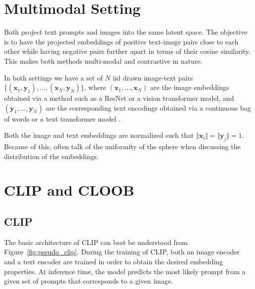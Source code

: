 \documentclass{scrarticle}
\begin{document}
\section{Multimodal Setting}

Both \citet{cloob,clip} project text prompts and images into the same latent space. The objective is to have the projected embeddings of positive text-image pairs close to each other while having negative pairs further apart in terms of their cosine similarity. This makes both methods multi-modal and contrastive in nature.

In both settings we have a set of $N$ iid drawn image-text pairs $\{(\mathbf{x}_1, \mathbf{y}_1), \dots, (\mathbf{x}_N, \mathbf{y}_N)\}$, where $(\mathbf{x}_1, \dots, \mathbf{x}_N)$ are the image embeddings obtained via a method such as a ResNet or a vision transformer model, and $(\mathbf{y}_1, \dots, \mathbf{y}_N)$ are the corresponding text encodings obtained via a continuous bag of words or a text transformer model \cite{cloob,clip}.

Both the image and text embeddings are normalized such that $\Vert \mathbf{x}_i \Vert = \Vert \mathbf{y}_j \Vert = 1$. Because of this, \citet{cloob} often talk of the uniformity of the sphere when discussing the distribution of the embeddings.

\section{CLIP and CLOOB}

\subsection{CLIP}

The basic architecture of CLIP can best be understood from Figure~\ref{fig:pseudo_clip}. During the training of CLIP, both an image encoder and a text encoder are trained in order to obtain the desired embedding properties. At inference time, the model predicts the most likely prompt from a given set of prompts that corresponds to a given image.
\end{document}
